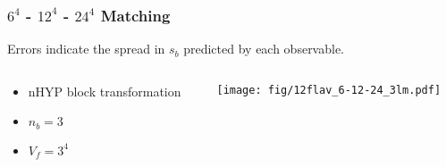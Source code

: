 \begin{frame}
  \frametitle{$6^4$ - $12^4$ - $24^4$ Matching}
  \begin{center}
    Errors indicate the spread in $s_b$ predicted by each observable.
  \end{center}
  \begin{columns}[T]
    \begin{column}{.3\textwidth}
      \begin{block}{}
        \begin{itemize}
          \item nHYP block transformation
          \item $n_b=3$
          \item $V_f=3^4$
        \end{itemize}
      \end{block}
    \end{column}
    \begin{column}{.7\textwidth}
      \begin{block}{}
        \texttt{[image: fig/12flav\_6-12-24\_3lm.pdf]}
      \end{block}
    \end{column}
  \end{columns}
  \begin{center}
  \end{center}
\end{frame}

